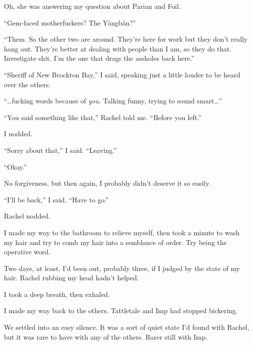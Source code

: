 Oh, she was answering my question about Parian and Foil.



``Gem-faced motherfuckers?  The Y\`{a}ngb\v{a}n?''



``Them.  So the other two are around.  They're here for work but they don't really hang out.  They're better at dealing with people than I am, so they do that.  Investigate shit.  I'm the one that drags the assholes back here.''



``Sheriff of New Brockton Bay,'' I said, speaking just a little louder to be heard over the others.



``\ldots{}fucking words because of \emph{you}.  Talking funny, trying to sound smart\ldots''



``You said something like that,'' Rachel told me.  ``Before you left.''



I nodded.



``Sorry about that,'' I said.  ``Leaving.''



``Okay.''



No forgiveness, but then again, I probably didn't deserve it so easily.



``I'll be back,'' I said.  ``Have to go.''



Rachel nodded.



I made my way to the bathroom to relieve myself, then took a minute to wash my hair and try to comb my hair into a semblance of order.  Try being the operative word.



Two days, at least, I'd been out, probably three, if I judged by the state of my hair.  Rachel rubbing my head hadn't helped.



I took a deep breath, then exhaled.



I made my way back to the others.  Tattletale and Imp had stopped bickering.



We settled into an easy silence.  It was a sort of quiet state I'd found with Rachel, but it was rare to have with any of the others.  Rarer still with Imp.



